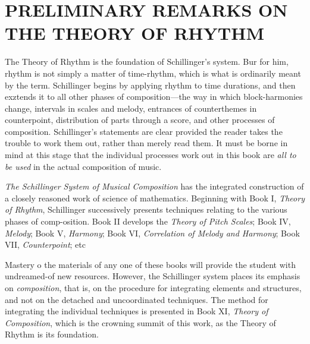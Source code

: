 
\chapter{PRELIMINARY REMARKS ON THE THEORY OF RHYTHM}

The Theory of Rhythm is the foundation of Schillinger's system. Bur for him, rhythm is not simply a matter of time-rhythm, which is what is ordinarily meant by the term. Schillinger begins by applying rhythm to time durations, and then exztends it to all other phases of composition---the way in which block-harmonies change, intervals in scales and melody, entrances of counterthemes in counterpoint, distribution of parts through a score, and other processes of composition. Schillinger's statements are clear provided the reader takes the trouble to work them out, rather than merely read them. It must be borne in mind at this stage that the individual processes work out in this book are \textit{all to be used} in the actual composition of music.

\textit{The Schillinger System of Musical Composition} has the integrated construction of a closely reasoned work of science of mathematics. Beginning with Book I, \textit{Theory of Rhythm}, Schillinger successively presents techniques relating to the various phases of comp-osition. Book II develops the \textit{Theory of Pitch Scales}; Book IV, \textit{Melody}; Book V, \textit{Harmony}; Book VI, \textit{Correlation of Melody and Harmony}; Book VII, \textit{Counterpoint}; etc

Mastery o the materials of any one of these books will provide the student with undreamed-of new resources. However, the Schillinger system places its emphasis on \textit{composition}, that is, on the procedure for integrating elements and structures, and not on the detached and uncoordinated techniques. The method for integrating the individual techniques is presented in Book XI, \textit{Theory of Composition}, which is the crowning summit of this work, as the Theory of Rhythm is its foundation.
